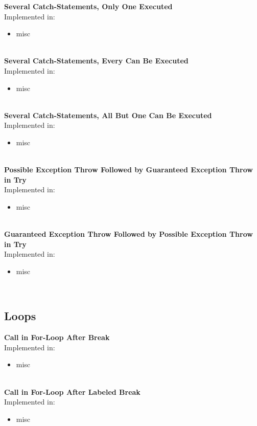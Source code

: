 \documentclass{article}
\begin{document}
\noindent
\textbf{Several Catch-Statements, Only One Executed}\\
Implemented in: 
\begin{itemize}
    \item misc
\end{itemize}
\\%

\noindent
\textbf{Several Catch-Statements, Every Can Be Executed}\\
Implemented in: 
\begin{itemize}
    \item misc
\end{itemize}
\\%

\noindent
\textbf{Several Catch-Statements, All But One Can Be Executed}\\
Implemented in: 
\begin{itemize}
    \item misc
\end{itemize}
\\%

\noindent
\textbf{Possible Exception Throw Followed by Guaranteed Exception Throw in Try}\\
Implemented in: 
\begin{itemize}
    \item misc
\end{itemize}
\\%

\noindent
\textbf{Guaranteed Exception Throw Followed by Possible Exception Throw in Try}\\
Implemented in: 
\begin{itemize}
    \item misc
\end{itemize}
\\%

\subsection{Loops}

\textbf{Call in For-Loop After Break}\\
Implemented in: 
\begin{itemize}
    \item misc
\end{itemize}
\\%

\noindent
\textbf{Call in For-Loop After Labeled Break}\\
Implemented in: 
\begin{itemize}
    \item misc
\end{itemize}
\\%
\end{document}
